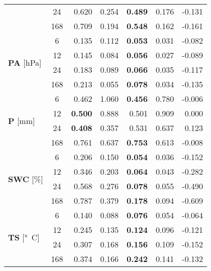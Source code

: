 \begin{table}
\begin{tabular}{p{2.1cm}c|rr|rr|r}
 & 24 & 0.620 & 0.254 & \bfseries 0.489 & 0.176 & -0.131 \\
 & 168 & 0.709 & 0.194 & \bfseries 0.548 & 0.162 & -0.161 \\
\cline{1-7}
\multirow[c]{4}{*}{\parbox{2.1cm}{\textbf{PA} [\si{hPa}]}} & 6 & 0.135 & 0.112 & \bfseries 0.053 & 0.031 & -0.082 \\
 & 12 & 0.145 & 0.084 & \bfseries 0.056 & 0.027 & -0.089 \\
 & 24 & 0.183 & 0.089 & \bfseries 0.066 & 0.035 & -0.117 \\
 & 168 & 0.213 & 0.055 & \bfseries 0.078 & 0.034 & -0.135 \\
\cline{1-7}
\multirow[c]{4}{*}{\parbox{2.1cm}{\textbf{P} [\si{mm}]}} & 6 & 0.462 & 1.060 & \bfseries 0.456 & 0.780 & -0.006 \\
 & 12 & \bfseries 0.500 & 0.888 & 0.501 & 0.909 & 0.000 \\
 & 24 & \bfseries 0.408 & 0.357 & 0.531 & 0.637 & 0.123 \\
 & 168 & 0.761 & 0.637 & \bfseries 0.753 & 0.613 & -0.008 \\
\cline{1-7}
\multirow[c]{4}{*}{\parbox{2.1cm}{\textbf{SWC} [\si{\%}]}} & 6 & 0.206 & 0.150 & \bfseries 0.054 & 0.036 & -0.152 \\
 & 12 & 0.346 & 0.203 & \bfseries 0.064 & 0.043 & -0.282 \\
 & 24 & 0.568 & 0.276 & \bfseries 0.078 & 0.055 & -0.490 \\
 & 168 & 0.787 & 0.379 & \bfseries 0.178 & 0.094 & -0.609 \\
\cline{1-7}
\multirow[c]{4}{*}{\parbox{2.1cm}{\textbf{TS} [\si{°C}]}} & 6 & 0.140 & 0.088 & \bfseries 0.076 & 0.054 & -0.064 \\
 & 12 & 0.245 & 0.135 & \bfseries 0.124 & 0.096 & -0.121 \\
 & 24 & 0.307 & 0.168 & \bfseries 0.156 & 0.109 & -0.152 \\
 & 168 & 0.374 & 0.166 & \bfseries 0.242 & 0.141 & -0.132 \\
\cline{1-7}
\bottomrule
\end{tabular}
\end{table}
